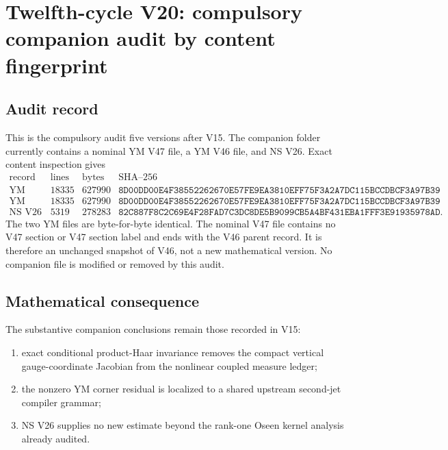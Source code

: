\documentclass[11pt]{article}
\theoremstyle{remark}
\begin{document}

\section{Twelfth-cycle V20: compulsory companion audit by content
fingerprint}
\label{sec:v12v20}

\subsection{Audit record}

This is the compulsory audit five versions after V15.  The companion
folder currently contains a nominal YM V47 file, a YM V46 file, and
NS V26.  Exact content inspection gives
\[
\begin{array}{c|r|r|c}
\text{record}&\text{lines}&\text{bytes}&\text{SHA--256}\\ \hline
\text{YM nominal V47}&18335&627990&
\texttt{8D00DD00E4F38552262670E57FE9EA3810EFF75F3A2A7DC115BCCDBCF3A97B39}\\
\text{YM V46}&18335&627990&
\texttt{8D00DD00E4F38552262670E57FE9EA3810EFF75F3A2A7DC115BCCDBCF3A97B39}\\
\text{NS V26}&5319&278283&
\texttt{82C887F8C2C69E4F28FAD7C3DC8DE5B9099CB5A4BF431EBA1FFF3E91935978AD}.
\end{array}                                                   \tag{20.1}
\]
The two YM files are byte-for-byte identical.  The nominal V47 file
contains no V47 section or V47 section label and ends with the V46
parent record.  It is therefore an unchanged snapshot of V46, not a
new mathematical version.  No companion file is modified or removed
by this audit.

\subsection{Mathematical consequence}

The substantive companion conclusions remain those recorded in V15:

\begin{enumerate}
\item exact conditional product-Haar invariance removes the compact
      vertical gauge-coordinate Jacobian from the nonlinear coupled
      measure ledger;
\item the nonzero YM corner residual is localized to a shared
      upstream second-jet compiler grammar;
\item NS V26 supplies no new estimate beyond the rank-one Oseen
      kernel analysis already audited.
\end{enumerate}
\end{document}
